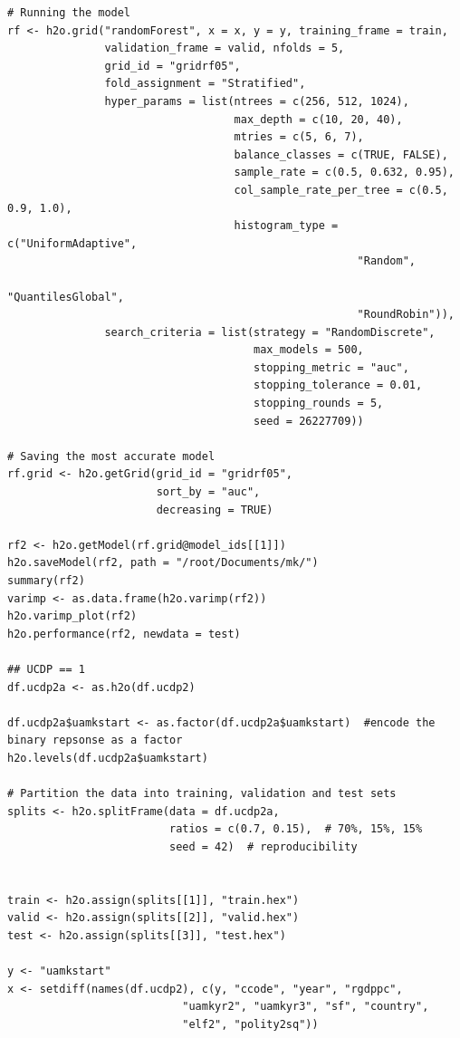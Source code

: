 \documentclass[a4paper,12pt]{article}
\begin{document}
\begin{verbatim}
# Running the model
rf <- h2o.grid("randomForest", x = x, y = y, training_frame = train, 
               validation_frame = valid, nfolds = 5, 
               grid_id = "gridrf05",
               fold_assignment = "Stratified",
               hyper_params = list(ntrees = c(256, 512, 1024),
                                   max_depth = c(10, 20, 40),
                                   mtries = c(5, 6, 7),
                                   balance_classes = c(TRUE, FALSE),
                                   sample_rate = c(0.5, 0.632, 0.95),
                                   col_sample_rate_per_tree = c(0.5, 0.9, 1.0),
                                   histogram_type = c("UniformAdaptive",
                                                      "Random",
                                                      "QuantilesGlobal",
                                                      "RoundRobin")),
               search_criteria = list(strategy = "RandomDiscrete", 
                                      max_models = 500, 
                                      stopping_metric = "auc", 
                                      stopping_tolerance = 0.01, 
                                      stopping_rounds = 5, 
                                      seed = 26227709)) 

# Saving the most accurate model
rf.grid <- h2o.getGrid(grid_id = "gridrf05",
                       sort_by = "auc",
                       decreasing = TRUE)

rf2 <- h2o.getModel(rf.grid@model_ids[[1]])
h2o.saveModel(rf2, path = "/root/Documents/mk/")
summary(rf2)
varimp <- as.data.frame(h2o.varimp(rf2))
h2o.varimp_plot(rf2)
h2o.performance(rf2, newdata = test)

## UCDP == 1
df.ucdp2a <- as.h2o(df.ucdp2)

df.ucdp2a$uamkstart <- as.factor(df.ucdp2a$uamkstart)  #encode the binary repsonse as a factor
h2o.levels(df.ucdp2a$uamkstart)

# Partition the data into training, validation and test sets
splits <- h2o.splitFrame(data = df.ucdp2a, 
                         ratios = c(0.7, 0.15),  # 70%, 15%, 15%
                         seed = 42)  # reproducibility


train <- h2o.assign(splits[[1]], "train.hex")   
valid <- h2o.assign(splits[[2]], "valid.hex") 
test <- h2o.assign(splits[[3]], "test.hex")

y <- "uamkstart"
x <- setdiff(names(df.ucdp2), c(y, "ccode", "year", "rgdppc",
                           "uamkyr2", "uamkyr3", "sf", "country",
                           "elf2", "polity2sq")) 


\end{verbatim}
\end{document}
